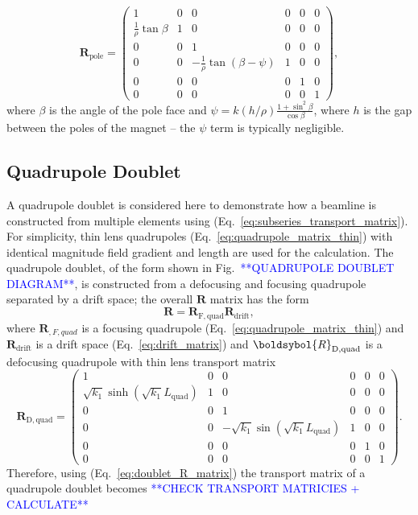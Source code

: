 \documentclass[../main.tex]{subfiles}
\begin{document}
\begin{equation}
\boldsymbol{R}_{\mathrm{pole}} =
\begin{pmatrix}
1 & 0 & 0 & 0 & 0 & 0 \\
\frac{1}{\rho}\tan\beta & 1 & 0 & 0 & 0 & 0 \\
0 & 0 & 1 & 0 & 0 & 0 \\
0 & 0 & -\frac{1}{\rho}\tan\left(\beta-\psi\right) & 1 & 0 & 0 \\
0 & 0 & 0 & 0 & 1 & 0 \\
0 & 0 & 0 & 0 & 0 & 1
\end{pmatrix},
\label{eq:pole_face_matrix}    
\end{equation}
where $\beta$ is the angle of the pole face and $\psi = k\left(h/\rho\right)\frac{1+\sin^{2}\beta}{\cos\beta}$, where $h$ is the gap between the poles of the magnet -- the $\psi$ term is typically negligible. 

\subsection{Quadrupole Doublet}

A quadrupole doublet is considered here to demonstrate how a beamline is constructed from multiple elements using (Eq.~\ref{eq:subseries_transport_matrix}). For simplicity, thin lens quadrupoles (Eq.~\ref{eq:quadrupole_matrix_thin}) with identical magnitude field gradient and length are used for the calculation. The quadrupole doublet, of the form shown in Fig.~\textcolor{blue}{**QUADRUPOLE DOUBLET DIAGRAM**}, is constructed from a defocusing and focusing quadrupole separated by a drift space; the overall $\boldsymbol{R}$ matrix has the form
\begin{equation}
\boldsymbol{R} = \boldsymbol{R}_{\mathrm{F, quad}}\boldsymbol{R}_{\mathrm{drift}}\boldsymbol{},
\label{eq:doublet_R_matrix}
\end{equation}
where $\boldsymbol{R}_{\mathrm,{F, quad}}$ is a focusing quadrupole (Eq.~\ref{eq:quadrupole_matrix_thin}) and $\boldsymbol{R}_{\mathrm{drift}}$ is a drift space (Eq.~\ref{eq:drift_matrix}) and $\boldsybol{R}_{\mathrm{D, quad}}$ is a defocusing quadrupole with thin lens transport matrix
\begin{equation}
\boldsymbol{R}_{\mathrm{D, quad}} =
\begin{pmatrix}
1 & 0 & 0 & 0 & 0 & 0\\
\sqrt{k_{1}}\sinh\left(\sqrt{k_{1}}L_{\mathrm{quad}}\right) & 1 & 0 & 0 & 0 & 0 \\
0 & 0 & 1 & 0 & 0 & 0 \\
0 & 0 & -\sqrt{k_{1}}\sin\left(\sqrt{k_{1}}L_{\mathrm{quad}}\right) & 1 & 0 & 0 \\
0 & 0 & 0 & 0 & 1 & 0 \\
0 & 0 & 0 & 0 & 0 & 1
\end{pmatrix}.
\label{eq:defocusing_quadrupole_matrix}    
\end{equation}
Therefore, using (Eq.~\ref{eq:doublet_R_matrix}) the transport matrix of a quadrupole doublet becomes 
\textcolor{blue}{**CHECK TRANSPORT MATRICIES + CALCULATE**}
\end{document}
